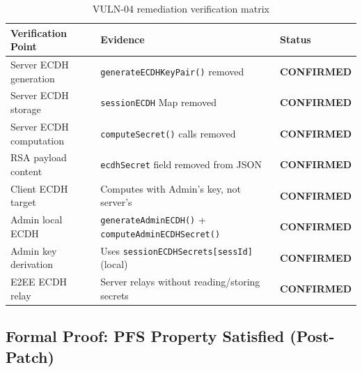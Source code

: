 \documentclass[12pt,a4paper]{article}
\begin{document}
\begin{table}[h!]
\centering
\begin{tabularx}{\textwidth}{lXl}
\toprule
\textbf{Verification Point} & \textbf{Evidence} & \textbf{Status} \\
\midrule
Server ECDH generation & \texttt{generateECDHKeyPair()} removed & \textcolor{safegreen}{\textbf{CONFIRMED}} \\
Server ECDH storage & \texttt{sessionECDH} Map removed & \textcolor{safegreen}{\textbf{CONFIRMED}} \\
Server ECDH computation & \texttt{computeSecret()} calls removed & \textcolor{safegreen}{\textbf{CONFIRMED}} \\
RSA payload content & \texttt{ecdhSecret} field removed from JSON & \textcolor{safegreen}{\textbf{CONFIRMED}} \\
Client ECDH target & Computes with Admin's key, not server's & \textcolor{safegreen}{\textbf{CONFIRMED}} \\
Admin local ECDH & \texttt{generateAdminECDH()} + \texttt{computeAdminECDHSecret()} & \textcolor{safegreen}{\textbf{CONFIRMED}} \\
Admin key derivation & Uses \texttt{sessionECDHSecrets[sessId]} (local) & \textcolor{safegreen}{\textbf{CONFIRMED}} \\
E2EE ECDH relay & Server relays without reading/storing secrets & \textcolor{safegreen}{\textbf{CONFIRMED}} \\
\bottomrule
\end{tabularx}
\caption{VULN-04 remediation verification matrix}
\end{table}

\subsection{Formal Proof: PFS Property Satisfied (Post-Patch)}
\end{document}
